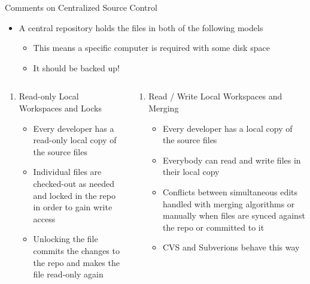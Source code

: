\documentclass[onlymath, nologo]{beamer}
\newcounter{savedenum}
\newcommand*{\saveenum}{\setcounter{savedenum}{\theenumi}}
\newcommand*{\resume}{\setcounter{enumi}{\thesavedenum}}
\begin{document}
  \begin{frame}{Comments on Centralized Source Control}
    \begin{itemize}
      \item A central repository holds the files in both of the following models
      \begin{itemize}
        \item This means a specific computer is required with some disk space
        \item It should be backed up!
      \end{itemize}
    \end{itemize}
    \begin{columns}[T]
      \begin{column}{0.5\textwidth}
        \begin{enumerate}
          \item Read-only Local Workspaces and Locks
          \begin{itemize}
            \item Every developer has a read-only local copy of the source files 
            \item Individual files are checked-out as needed and locked in the repo in 
                  order to gain write access 
            \item Unlocking the file commits the changes to the repo and makes the file 
                  read-only again
          \end{itemize}
          \saveenum
        \end{enumerate}
      \end{column}
      \begin{column}{0.5\textwidth}
        \begin{enumerate}
          \resume
          \item Read / Write Local Workspaces and Merging
          \begin{itemize}
            \item Every developer has a local copy of the source files
            \item Everybody can read and write files in their local copy
            \item Conflicts between simultaneous edits handled with merging algorithms 
                  or manually when files are synced against the repo or committed to it 
            \item CVS and Subverions behave this way
          \end{itemize}
        \end{enumerate}
      \end{column}
    \end{columns}
  \end{frame}
\end{document}
